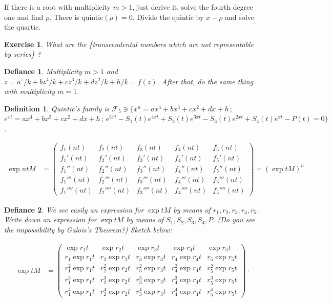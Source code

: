 \documentclass[12pt,a4paper]{article}
\newtheorem{exercise}{Exercise}[section]
\newtheorem{defy}{Defiance}
\newtheorem{definition}{Definition}[section]
\begin{document}
\vspace{3mm}

If there is a root with multiplicity $m > 1$, just derive it, solve the fourth degree one and find $\rho$. There is quintic$(\rho) = 0$. Divide the quintic by $x - \rho$ and solve the quartic.

\begin{exercise}
What are the \{transcendental numbers which are not representable by series\} ?
\end{exercise}

\begin{defy}
Multiplicity $m > 1$ and $z = a^z/k + bz^4/k + cz^3/k + dz^2/k + h/k = f(z)$.
After that, do the same thing with multiplicity $m = 1$.
\end{defy}

\begin{definition}
Quintic's family is $\mathcal{F}_5 \ni \{ x^n = ax^4 + bx^3 + cx^2 + dx + h\,;\,$ \\
$e^{xt} = ax^4 + bx^3 + cx^2 + dx + h\,;\,e^{5xt} - S_1(t) e^{4xt} + S_2(t) e^{3xt} - S_3(t) e^{2xt} + S_4(t) e^{xt} - P(t) = 0 \}$.
\end{definition}

\begin{align}
  \exp ntM &= \left(\begin{matrix}f_1(nt) & f_2(nt) & f_3(nt) & f_4(nt) & f_5(nt) \\ f_1'(nt) & f_2'(nt) & f_3'(nt) & f_4'(nt) & f_5'(nt) \\ f_1''(nt) & f_2''(nt) & f_3''(nt) & f_4''(nt) & f_5''(nt) \\ f_1'''(nt) & f_2'''(nt) & f_3'''(nt) & f_4'''(nt) & f_5'''(nt) \\ f_1''''(nt) & f_2''''(nt) & f_3''''(nt) & f_4''''(nt) & f_5''''(nt) \end{matrix}\right) = (\exp tM)^n
\end{align}

\begin{defy}
We see easily an expression for $\exp tM$ by means of $r_1, r_2, r_3, r_4, r_5$. Write down an expression for $\exp tM$ by means of $S_1, S_2, S_3, S_4, P$. (Do you see the impossibility by Galois's Theorem?) Sketch below:
\end{defy}

\begin{align}
\exp tM &=  \left(\begin{matrix}\exp{r_1 t} & \exp{r_2 t} & \exp{r_3 t} & \exp{r_4 t} & \exp{r_5 t} \\ r_1 \exp{r_1 t} & r_2 \exp{r_2 t} & r_3 \exp{r_3 t} & r_4 \exp{r_4 t} & r_5 \exp{r_5 t}  \\ r_1^2 \exp{r_1 t} & r_2^2 \exp{r_2 t} & r_3^2 \exp{r_3 t} & r_4^2 \exp{r_4 t} & r_5^2 \exp{r_5 t} \\ r_1^3 \exp{r_1 t} & r_2^3 \exp{r_2 t} & r_3^3 \exp{r_3 t} & r_4^3 \exp{r_4 t} & r_5^3 \exp{r_5 t}  \\ r_1^4 \exp{r_1 t} & r_2^4 \exp{r_2 t} & r_3^4 \exp{r_3 t} & r_4^4 \exp{r_4 t} & r_5^4 \exp{r_5 t}  \end{matrix}\right) \cdot \nonumber
\end{align}
\end{document}
